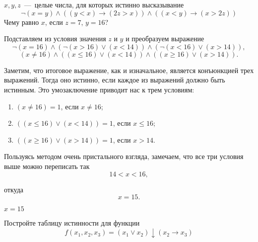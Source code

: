 
\setcounter{example}{0}

\begin{exercise}
	$x, y, z$~---~целые числа, для которых истинно высказывание
\begin{equation}
		\neg(x=y)\wedge((y<x)\rightarrow(2z>x))\wedge((x<y)\rightarrow(x>2z))
		\label{true_eq}
\end{equation}
	Чему равно $x$, если $z=7$, $y=16$?
\end{exercise}

\begin{solution}
	Подставляем из условия значения $z$ и $y$ и преобразуем выражение 
	$$
		\neg(x=16)\wedge(\neg(x>16)\vee(x<14))\wedge(\neg(x<16)\vee(x>14)),
	$$
	$$
		(x\neq16)\wedge((x\leqslant16)\vee(x<14))\wedge((x\geqslant16)\vee(x>14)).
	$$
	
	Заметим, что итоговое выражение, как и изначальное, является конъюнкцией
	трех выражений. Тогда оно истинно, если каждое из выражений должно быть
	истинным. Это умозаключение приводит нас к трем условиям:
\begin{enumerate}
	\item $(x\neq16)=1$, если $x\neq16$;
	\item $((x\leqslant16)\vee(x<14))=1$, если $x\leqslant16$;
	\item $((x\geqslant16)\vee(x>14))=1$, если $x>14$.
\end{enumerate}
	
	Пользуясь методом очень пристального взгляда, замечаем, что
	все три условия выше можно переписать так
	$$14<x<16,$$

	\noindent откуда
	$$x=15.$$
\end{solution}

\begin{answer}
	$x=15$
\end{answer}

\newpage

\begin{exercise}
	Постройте таблицу истинности для функции
\begin{equation}
	f(x_1,x_2,x_3)=(x_1\vee x_2)\downarrow(x_2\rightarrow x_3)
	\label{zero}
\end{equation}
\end{exercise}

